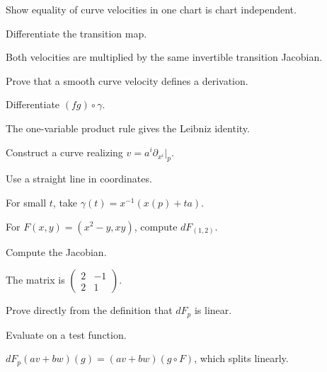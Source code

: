 \begin{exercise}\label{exr:vii04-08}
Show equality of curve velocities in one chart is chart independent.
\end{exercise}
\begin{hint}
Differentiate the transition map.
\end{hint}
\begin{solution}
Both velocities are multiplied by the same invertible transition Jacobian.
\end{solution}

\begin{exercise}\label{exr:vii04-09}
Prove that a smooth curve velocity defines a derivation.
\end{exercise}
\begin{hint}
Differentiate \((fg)\circ\gamma\).
\end{hint}
\begin{solution}
The one-variable product rule gives the Leibniz identity.
\end{solution}

\begin{exercise}\label{exr:vii04-10}
Construct a curve realizing \(v=a^i\partial_{x^i}|_p\).
\end{exercise}
\begin{hint}
Use a straight line in coordinates.
\end{hint}
\begin{solution}
For small \(t\), take \(\gamma(t)=x^{-1}(x(p)+ta)\).
\end{solution}

\begin{exercise}\label{exr:vii04-11}
For \(F(x,y)=(x^2-y,xy)\), compute \(dF_{(1,2)}\).
\end{exercise}
\begin{hint}
Compute the Jacobian.
\end{hint}
\begin{solution}
The matrix is \(\begin{pmatrix}2&-1\\2&1\end{pmatrix}\).
\end{solution}

\begin{exercise}\label{exr:vii04-12}
Prove directly from the definition that \(dF_p\) is linear.
\end{exercise}
\begin{hint}
Evaluate on a test function.
\end{hint}
\begin{solution}
\(dF_p(av+bw)(g)=(av+bw)(g\circ F)\), which splits linearly.
\end{solution}

